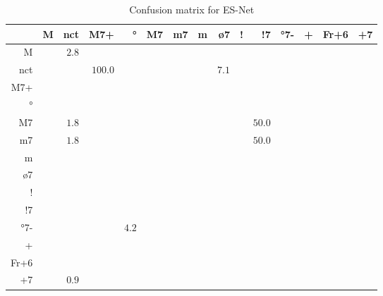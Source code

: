 \documentclass{article}
\begin{document}
\begin{table}
\begin{center}
\begin{tabular}{r|r|r|r|r|r|r|r|r|r|r|r|r|r|r}
       & M & nct & M7+ & ° & M7 & m7 & m & ø7 & ! & !7 & °7- & + & Fr+6 & +7 \\ \hline
 M & $ $ & $2.8$ & $ $ & $ $ & $ $ & $ $ & $ $ & $ $ & $ $ & $ $ & $ $ & $ $ & $ $ & $ $  \\ \hline
 nct & $ $ & $ $ & $100.0$ & $ $ & $ $ & $ $ & $ $ & $7.1$ & $ $ & $ $ & $ $ & $ $ & $ $ & $ $  \\ \hline
 M7+ & $ $ & $ $ & $ $ & $ $ & $ $ & $ $ & $ $ & $ $ & $ $ & $ $ & $ $ & $ $ & $ $ & $ $  \\ \hline
 ° & $ $ & $ $ & $ $ & $ $ & $ $ & $ $ & $ $ & $ $ & $ $ & $ $ & $ $ & $ $ & $ $ & $ $  \\ \hline
 M7 & $ $ & $1.8$ & $ $ & $ $ & $ $ & $ $ & $ $ & $ $ & $ $ & $50.0$ & $ $ & $ $ & $ $ & $ $  \\ \hline
 m7 & $ $ & $1.8$ & $ $ & $ $ & $ $ & $ $ & $ $ & $ $ & $ $ & $50.0$ & $ $ & $ $ & $ $ & $ $  \\ \hline
 m & $ $ & $ $ & $ $ & $ $ & $ $ & $ $ & $ $ & $ $ & $ $ & $ $ & $ $ & $ $ & $ $ & $ $  \\ \hline
 ø7 & $ $ & $ $ & $ $ & $ $ & $ $ & $ $ & $ $ & $ $ & $ $ & $ $ & $ $ & $ $ & $ $ & $ $  \\ \hline
 ! & $ $ & $ $ & $ $ & $ $ & $ $ & $ $ & $ $ & $ $ & $ $ & $ $ & $ $ & $ $ & $ $ & $ $  \\ \hline
 !7 & $ $ & $ $ & $ $ & $ $ & $ $ & $ $ & $ $ & $ $ & $ $ & $ $ & $ $ & $ $ & $ $ & $ $  \\ \hline
 °7- & $ $ & $ $ & $ $ & $4.2$ & $ $ & $ $ & $ $ & $ $ & $ $ & $ $ & $ $ & $ $ & $ $ & $ $  \\ \hline
 + & $ $ & $ $ & $ $ & $ $ & $ $ & $ $ & $ $ & $ $ & $ $ & $ $ & $ $ & $ $ & $ $ & $ $  \\ \hline
 Fr+6 & $ $ & $ $ & $ $ & $ $ & $ $ & $ $ & $ $ & $ $ & $ $ & $ $ & $ $ & $ $ & $ $ & $ $  \\ \hline
 +7 & $ $ & $0.9$ & $ $ & $ $ & $ $ & $ $ & $ $ & $ $ & $ $ & $ $ & $ $ & $ $ & $ $ & $ $  \\ \hline
\end{tabular}
\caption{Confusion matrix for ES-Net}
\end{center}
\end{table}
\end{document}
